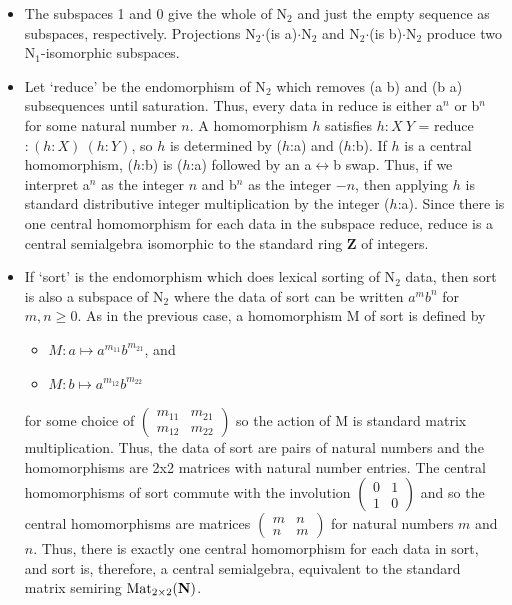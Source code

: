\documentclass[11pt]{article}
\begin{document}
\begin{itemize}
\item{The subspaces 1 and 0 give the whole of N$_2$ and just the empty sequence as subspaces, respectively.  
Projections N$_2$$\cdot$(is a)$\cdot$N$_2$ and N$_2$$\cdot$(is b)$\cdot$N$_2$ produce two N$_1$-isomorphic subspaces.}

\item{Let `reduce' be the endomorphism of N$_2$ which removes (a b) and (b a) subsequences until saturation.  Thus, every data in reduce
is either a$^n$ or b$^n$ for some natural number $n$.  A homomorphism $h$ satisfies $h:X\ Y$ = reduce $:(h:X)\ (h:Y)$, so 
$h$ is determined by ($h$:a) and ($h$:b).  If $h$ is a central homomorphism, ($h$:b) is ($h$:a) followed by an 
a$\leftrightarrow$b swap.  Thus, if we interpret a$^n$ as the integer $n$ and b$^n$ as the integer $-n$, then applying $h$ 
is standard distributive integer multiplication by the integer ($h$:a).  Since there is one central homomorphism for each data in the subspace reduce, 
reduce is a central semialgebra isomorphic to the standard ring $\mathbf Z$ of integers.}

\item{If `sort' is the endomorphism which does lexical sorting of N$_2$ data, then sort is also a subspace of N$_2$ where the 
data of sort can be written $a^m b^n$ for $m,n\ge 0$.  As in the previous case, a homomorphism M of sort is defined by  
\begin{itemize}
\item [] $M: a\mapsto a^{m_{11}} b^{m_{21}}$, and 
\item [] $M: b\mapsto a^{m_{12}} b^{m_{22}}$ 
\end{itemize}
for some choice of 
$
\left (
\begin{array}{cc} 
m_{11} & m_{21} \\ m_{12} & m_{22}  
\end{array}
\right ) 
$
so the action of M is standard matrix multiplication.  Thus, the data of sort are pairs of natural numbers and the 
homomorphisms are 2x2 matrices with natural number entries.  The central homomorphisms of sort 
commute with the involution 
$
\left (
\begin{array}{cc} 
0 & 1 \\ 1 & 0 
\end{array}
\right ) 
$
and so the central homomorphisms are matrices 
$
\left (
\begin{array}{cc} 
m & n \\ n & m 
\end{array}
\right ) 
$
for natural numbers $m$ and $n$.  Thus, there is exactly one central homomorphism for each data in sort, 
and sort is, therefore, a central semialgebra, equivalent to the standard matrix semiring ${\rm Mat}_{2\times2}(\mathbf N)$.
}


\end{itemize}
\end{document}
